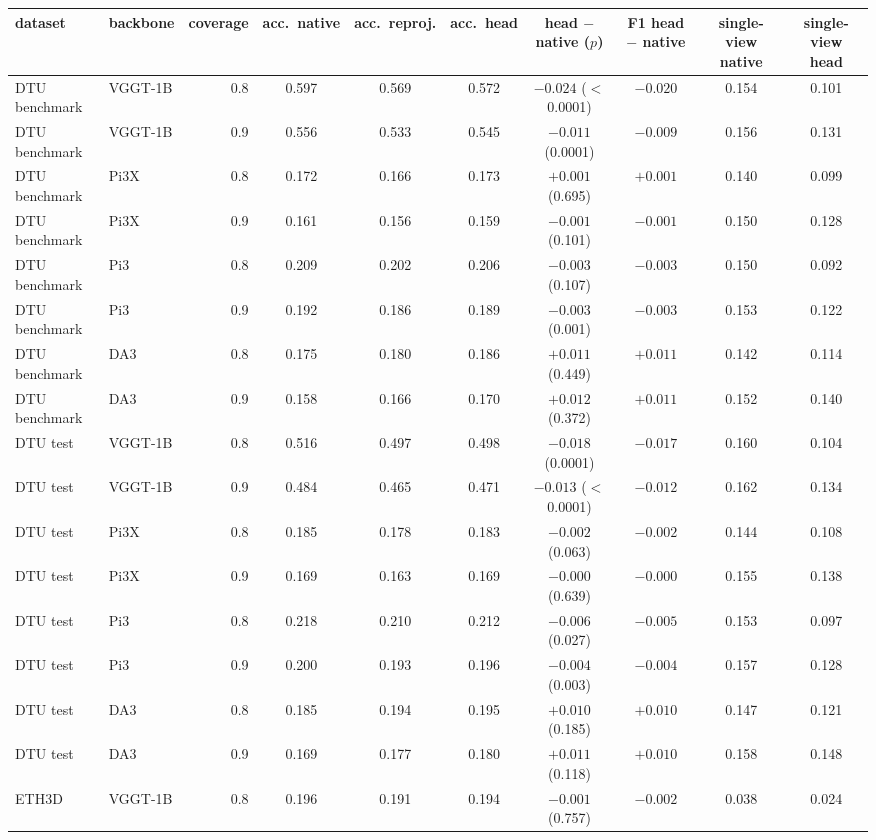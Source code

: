 \begin{tabular}{llrccccccc}
\toprule
dataset & backbone & coverage & acc.\ native & acc.\ reproj. & acc.\ head & head $-$ native ($p$) & F1 head $-$ native & single-view native & single-view head \\
\midrule
DTU benchmark & VGGT-1B & 0.8 & 0.597 & 0.569 & 0.572 & $-0.024$ ($<$0.0001) & $-0.020$ & 0.154 & 0.101 \\
DTU benchmark & VGGT-1B & 0.9 & 0.556 & 0.533 & 0.545 & $-0.011$ (0.0001) & $-0.009$ & 0.156 & 0.131 \\
DTU benchmark & Pi3X & 0.8 & 0.172 & 0.166 & 0.173 & $+0.001$ (0.695) & $+0.001$ & 0.140 & 0.099 \\
DTU benchmark & Pi3X & 0.9 & 0.161 & 0.156 & 0.159 & $-0.001$ (0.101) & $-0.001$ & 0.150 & 0.128 \\
DTU benchmark & Pi3 & 0.8 & 0.209 & 0.202 & 0.206 & $-0.003$ (0.107) & $-0.003$ & 0.150 & 0.092 \\
DTU benchmark & Pi3 & 0.9 & 0.192 & 0.186 & 0.189 & $-0.003$ (0.001) & $-0.003$ & 0.153 & 0.122 \\
DTU benchmark & DA3 & 0.8 & 0.175 & 0.180 & 0.186 & $+0.011$ (0.449) & $+0.011$ & 0.142 & 0.114 \\
DTU benchmark & DA3 & 0.9 & 0.158 & 0.166 & 0.170 & $+0.012$ (0.372) & $+0.011$ & 0.152 & 0.140 \\
\midrule
DTU test & VGGT-1B & 0.8 & 0.516 & 0.497 & 0.498 & $-0.018$ (0.0001) & $-0.017$ & 0.160 & 0.104 \\
DTU test & VGGT-1B & 0.9 & 0.484 & 0.465 & 0.471 & $-0.013$ ($<$0.0001) & $-0.012$ & 0.162 & 0.134 \\
DTU test & Pi3X & 0.8 & 0.185 & 0.178 & 0.183 & $-0.002$ (0.063) & $-0.002$ & 0.144 & 0.108 \\
DTU test & Pi3X & 0.9 & 0.169 & 0.163 & 0.169 & $-0.000$ (0.639) & $-0.000$ & 0.155 & 0.138 \\
DTU test & Pi3 & 0.8 & 0.218 & 0.210 & 0.212 & $-0.006$ (0.027) & $-0.005$ & 0.153 & 0.097 \\
DTU test & Pi3 & 0.9 & 0.200 & 0.193 & 0.196 & $-0.004$ (0.003) & $-0.004$ & 0.157 & 0.128 \\
DTU test & DA3 & 0.8 & 0.185 & 0.194 & 0.195 & $+0.010$ (0.185) & $+0.010$ & 0.147 & 0.121 \\
DTU test & DA3 & 0.9 & 0.169 & 0.177 & 0.180 & $+0.011$ (0.118) & $+0.010$ & 0.158 & 0.148 \\
\midrule
ETH3D & VGGT-1B & 0.8 & 0.196 & 0.191 & 0.194 & $-0.001$ (0.757) & $-0.002$ & 0.038 & 0.024 \\

\end{tabular}

